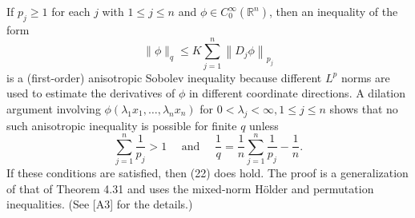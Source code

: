 \begin{para}
  If $p_j \geq 1$ for each $j$ with $1 \leq j \leq n$ and $\phi \in C_0^{\infty}\left(\mathbb{R}^n\right)$,
  then an inequality of the form
  \begin{equation}
    \|\phi\|_q \leq K \sum_{j=1}^n\left\|D_j \phi\right\|_{p_j}
  \end{equation}
  is a (first-order) anisotropic Sobolev inequality because different $L^p$ norms are used to estimate the 
  derivatives of $\phi$ in different coordinate directions.
  A dilation argument involving $\phi\left(\lambda_1 x_1, \ldots, \lambda_n x_n\right)$
  for $0<\lambda_j<\infty, 1 \leq j \leq n$ shows that no such anisotropic inequality
  is possible for finite $q$ unless
  \[\sum_{j=1}^n \frac{1}{p_j}>1 \quad \text { and }
    \quad \frac{1}{q}=\frac{1}{n} \sum_{j=1}^n \frac{1}{p_j}-\frac{1}{n}.\]
  If these conditions are satisfied, then (22) does hold. The proof is a generalization of that of
  Theorem 4.31 and uses the mixed-norm Hölder and permutation inequalities. (See [A3] for the details.)
\end{para}


